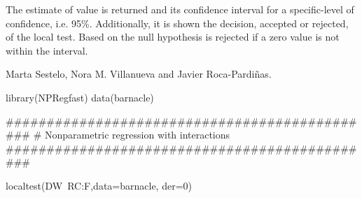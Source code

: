 %
\begin{Value}
The estimate of  value is returned and its confidence interval for a specific-level of confidence, i.e. 95\%. Additionally, it is shown the decision, accepted or rejected,  of the local test. Based on the null hypothesis is rejected if a zero value is not within the interval. 
\end{Value}
%
\begin{Author}\relax
Marta Sestelo, Nora M. Villanueva and Javier Roca-Pardiñas.
\end{Author}
%
\begin{Examples}
\begin{ExampleCode}

library(NPRegfast)
data(barnacle)

##############################################
# Nonparametric regression with interactions
##############################################

localtest(DW~RC:F,data=barnacle, der=0)

\end{ExampleCode}
\end{Examples}


